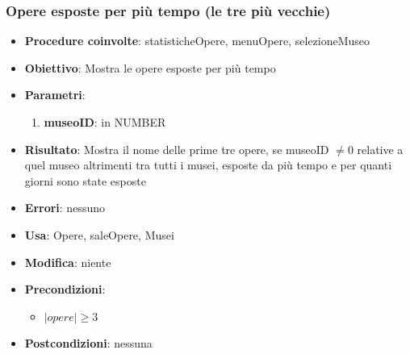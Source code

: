 \subsubsection{Opere esposte per più tempo (le tre più vecchie)}
\begin{itemize}
	\item \textbf{Procedure coinvolte}: statisticheOpere, menuOpere, selezioneMuseo
	\item \textbf{Obiettivo}: Mostra le opere esposte per più tempo
	\item \textbf{Parametri}:
	\begin{enumerate}
		\item \textbf{museoID}: in NUMBER
	\end{enumerate}
	\item \textbf{Risultato}: Mostra il nome delle prime tre opere, se museoID $\neq 0$ relative a quel museo altrimenti tra tutti i musei, esposte da più tempo e per quanti giorni sono state esposte
	\item \textbf{Errori}: nessuno
	\item \textbf{Usa}: Opere, saleOpere, Musei
	\item \textbf{Modifica}: niente
	\item \textbf{Precondizioni}:
	\begin{itemize}
		\item $|opere| \ge 3$ 
	\end{itemize}
	\item \textbf{Postcondizioni}: nessuna
\end{itemize}

